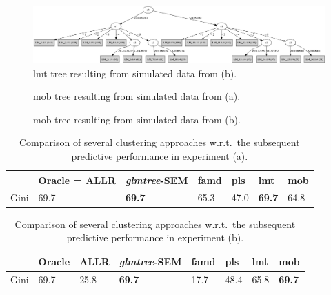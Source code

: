 \begin{figure}
\centering \includegraphics[scale=0.2]{R_CODE_FIGURES/chapitre6/graphLMT.png}
\caption{\gls{lmt} tree resulting from simulated data from (b).}
\label{fig:simu_b_lmt}
\end{figure}

\begin{figure}
\centering \resizebox{.7\textwidth}{!}{}
\caption{\gls{mob} tree resulting from simulated data from (a).}
\label{fig:simu_a_mob}
\end{figure}

\begin{figure}
\centering \resizebox{.7\textwidth}{!}{}
\caption{\gls{mob} tree resulting from simulated data from (b).}
\label{fig:simu_b_mob}
\end{figure}

\begin{table}[t]
\caption{\label{tab:num_exp_tree_pas} Comparison of several clustering approaches w.r.t.\ the subsequent predictive performance in experiment (a).}
\centering
\begin{tabular}{ll|lllll}
 & Oracle = ALLR & \textit{glmtree}-SEM & \gls{famd} & \gls{pls} & \gls{lmt} & \gls{mob} \\
\hline
Gini & 69.7 & \textbf{69.7} & 65.3 & 47.0 & \textbf{69.7} & 64.8 \\
\end{tabular}
\end{table}


\begin{table}[t]
\caption{\label{tab:num_exp_tree} Comparison of several clustering approaches w.r.t.\ the subsequent predictive performance in experiment (b).}
\centering
\begin{tabular}{ll|llllll}
 & Oracle & ALLR & \textit{glmtree}-SEM & \gls{famd} & \gls{pls} & \gls{lmt} & \gls{mob} \\
\hline
Gini & 69.7 & 25.8 & \textbf{69.7} & 17.7 & 48.4 & 65.8 & \textbf{69.7} \\
\end{tabular}
\end{table}



